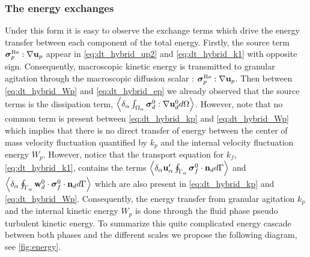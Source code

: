 \subsubsection{The energy exchanges}

Under this form it is easy to observe the exchange terms which drive the energy transfer between each component of the total energy. 
Firstly, the source term $\bm{\sigma}_p^\text{Re} :\mathbf{\nabla} \textbf{u}_p$ appear in \ref{eq:dt_hybrid_up2} and \ref{eq:dt_hybrid_k1} with opposite sign. 
Consequently, macroscopic kinetic energy is transmitted to granular agitation through the macroscopic diffusion scalar : $\bm{\sigma}_p^\text{Re} :\mathbf{\nabla} \textbf{u}_p$. 
Then between \ref{eq:dt_hybrid_Wp} and \ref{eq:dt_hybrid_ep} we already observed that the source terms is the dissipation term,  $\left<\delta_\alpha \int_{\Omega_{\alpha}} \bm{\sigma}_d^0:\mathbf{\nabla} \textbf{u}_d^0 d\Omega\right>$.
However, note that no common term is present between \ref{eq:dt_hybrid_kp} and \ref{eq:dt_hybrid_Wp} which implies that there is no direct transfer of energy between the center of mass velocity fluctuation quantified by $k_p$ and the internal velocity fluctuation energy $W_p$. 
However, notice that the transport equation for $k_f$, \ref{eq:dt_hybrid_k1}, contains the terms $\left<\delta_\alpha \textbf{u}_\alpha' \oint_{\Gamma_{\alpha}} \bm{\sigma}_f^0 \cdot \textbf{n}_d d\Gamma\right>$ and $\left<\delta_\alpha \oint_{\Gamma_{\alpha}} \textbf{w}_d^0 \cdot \bm{\sigma}_f^0 \cdot \textbf{n}_d d\Gamma\right>$ which are also present in \ref{eq:dt_hybrid_kp} and \ref{eq:dt_hybrid_Wp}. 
Consequently, the energy transfer from granular agitation $k_p$ and the internal kinetic energy $W_p$ is done through the fluid phase pseudo turbulent kinetic energy. 
To summarize this quite complicated energy cascade between both phases and the different scales we propose the following diagram, see \ref{fig:energy}. 
